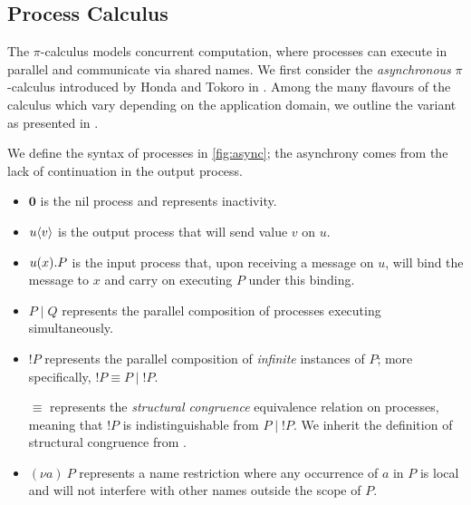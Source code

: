 \subsection{Process Calculus}
\label{subsection:picalculus}

The $\pi$-calculus models concurrent computation, 
where processes can execute in parallel and communicate 
via shared names.
We first consider the \textit{asynchronous} 
$\pi$-calculus introduced by 
Honda and Tokoro in \cite{AsyncHonda}.
Among the many flavours of the calculus 
which vary depending on the application domain,
we outline the variant as presented in \cite{C406Lecture}. 

We define the syntax of processes in \cref{fig:async};
the asynchrony comes from the lack of 
continuation in the output process.

\begin{itemize}
\item $\mathbf{0}$ is the nil process and represents inactivity.
\item ${{u}\langle {v} \rangle}$ is the output process that will send value $v$ on $u$.
\item ${{u}({x})}.P$ is the input process that,
 upon receiving a message on $u$, 
 will bind the message to $x$ and 
 carry on executing $P$ under this binding.
\item $P\mid Q$ represents the parallel composition of 
processes executing simultaneously.
\item $!P$ represents the parallel composition of 
\textit{infinite} instances of $P$; 
more specifically, $!P \equiv P \mid {!P}$.

$\equiv$ represents the \textit{structural congruence} 
equivalence relation
on processes, meaning that $!P$ is indistinguishable from 
$P \mid {!P}$. We inherit the definition of structural congruence from
\cite{C406Lecture}.

\item $(\nu a)~P$ represents a name restriction 
where any occurrence of $a$ in $P$ is local
 and will not interfere with other names outside the scope of $P$.
\end{itemize}


